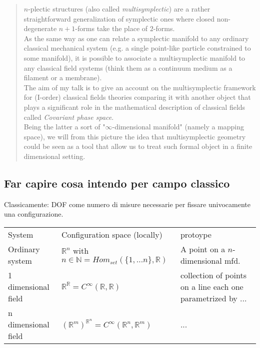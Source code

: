 \documentclass[a4paper,12pt,fleqn]{scrartcl}  %
\begin{document}
\maketitle

\begin{abstract}
$n$-plectic structures (also called \emph{multisymplectic}) are a rather straightforward generalization of symplectic ones where closed non-degenerate $n+1$-forms take the place of  $2$-forms.
\\
As the same way as one can relate a symplectic manifold to any ordinary classical mechanical system (e.g. a single point-like particle constrained to some manifold), it is possible to associate a multisymplectic manifold to any classical field systems (think them as a continuum medium as a filament or a membrane).
\\
The aim of my talk is to give an account on the multisymplectic framework for (I-order) classical fields theories comparing it with another object that plays a significant role in the mathematical description of classical fields called \emph{Covariant phase space}.
\\
Being the latter a sort of "$\infty$-dimensional manifold" (namely a mapping space), we will from this picture the idea that multisymplectic geometry could be seen as a tool that allow us to treat such formal object in a finite dimensional setting.


\end{abstract}

			\nocite{*}
			
			

\subsection{Far capire cosa intendo per campo classico}
Classicamente: DOF come numero di misure necessarie per fissare univocamente una configurazione.
\begin{table}[]
\begin{tabular}{lll}
	System & Configuration space (locally) & protoype 
 	\\
	Ordinary system & $\mathbb{R}^n$ with $n\in \mathbb{N} = Hom_{set}(\{1,\ldots n\}, \mathbb{R})$ & A point on a $n$-dimensional mfd.
	\\
	1 dimensional field & $\mathbb{R}^\mathbb{R} = C^\infty(\mathbb{R},\mathbb{R})$ & collection of points on a line each one parametrized by ...
	\\
	n dimensional field & $(\mathbb{R}^m)^{\mathbb{R}^n} = C^\infty (\mathbb{R}^n, \mathbb{R}^m)$ & ...
\end{tabular}
\end{table}
\end{document}

